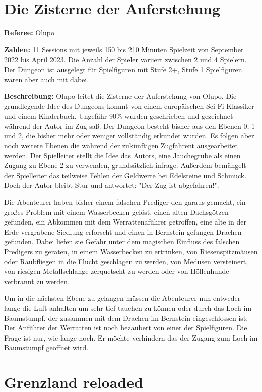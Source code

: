 \documentclass[11pt]{wbzine}
\begin{document}
\begin{multicols}{2}
\section{Die Zisterne der Auferstehung}

\textbf{Referee:} Olupo

\textbf{Zahlen:} 11 Sessions mit jeweils 150 bis 210 Minuten Spielzeit von
September 2022 bis April 2023. Die Anzahl der Spieler variiert zwischen
2 und 4 Spielern. Der Dungeon ist ausgelegt für Spielfiguren mit Stufe
2+, Stufe 1 Spielfiguren waren aber auch mit dabei.

\textbf{Beschreibung:} Olupo leitet die Zisterne der Auferstehung von
Olupo. Die grundlegende Idee des Dungeons kommt von einem europäischen
Sci-Fi Klassiker und einem Kinderbuch. Ungefähr 90\% wurden geschrieben
und gezeichnet während der Autor im Zug saß. Der Dungeon besteht bisher
aus den Ebenen 0, 1 und 2, die bisher mehr oder weniger vollständig
erkundet wurden. Es folgen aber noch weitere Ebenen die während der
zukünftigen Zugfahrent ausgearbeitet werden. Der Spielleiter stellt
die Idee das Autors, eine Jauchegrube als einen Zugang zu Ebene 2 zu
verwenden, grundsätzlich infrage. Außerdem bemängelt der Spielleiter
das teilweise Fehlen der Geldwerte bei Edelsteine und Schmuck. Doch der
Autor bleibt Stur und antwortet: "Der Zug ist abgefahren!".

Die Abenteurer haben bisher einem falschen Prediger den garaus gemacht,
ein großes Problem mit einem Wasserbecken gelöst, einen alten
Dachsgötzen gefunden, ein Abkommen mit dem Werrattenaführer getroffen,
eine alte in der Erde vergrabene Siedlung erforscht und einen in Bernstein
gefangen Drachen gefunden. Dabei liefen sie Gefahr unter dem magischen
Einfluss des falschen Predigers zu geraten, in einem Wasserbecken
zu ertrinken, von Riesenspitzmäusen oder Raubfliegen in die Flucht
geschlagen zu werden, von Medusen versteinert, von riesigen Metallschlange
zerquetscht zu werden oder von Höllenhunde verbrannt zu werden.

Um in die nächsten Ebene zu gelangen müssen die Abenteurer nun
entweder lange die Luft anhalten um sehr tief tauchen zu können oder
durch das Loch im Baumstumpf, der zusammen mit dem Drachen im Bernstein
eingeschlossen ist. Der Anführer der Werratten ist noch bezaubert von
einer der Spielfiguren. Die Frage ist nur, wie lange noch. Er möchte
verhindern das der Zugang zum Loch im Baumstumpf geöffnet wird.

\section{Grenzland reloaded}


\end{multicols}
\end{document}
